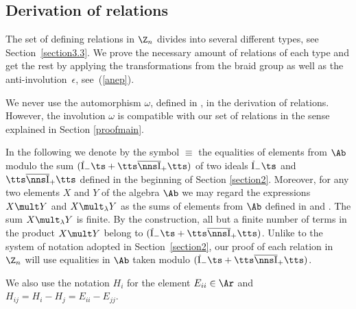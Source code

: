 \documentclass[11pt]{article}
\def\Ib{\tts\overline{\nns\rm I}_+\tts}\def\J{\mathrm{J}}\def\Jb{\,\overline{\!\rm I}_-\ts}\def\k{\mathfrak{k}}
\numberwithin{equation}{section}
\begin{document}
\subsection{Derivation of relations}\label{sectionDerRel}

The set  of def\/ining relations in $\Z_n$ divides into several dif\/ferent types,
see Section~\ref{section3.3}. We prove the necessary amount of relations
of each type and get the rest by applying the transformations from the braid group as well as the anti-involution~$\epsilon$, see~(\ref{anep}).


We never use the automorphism $\omega$, def\/ined in , in the derivation of relations. However, the involution $\omega$ is compatible with our set
of relations in the sense explained in Section \ref{proofmain}.


In the following we denote by the symbol $ \equiv $ the equalities of elements from $\Ab$ modulo the sum $(\Jb+\Ib )$ of two ideals $\Jb$ and $\Ib$
def\/ined in the beginning of Section \ref{section2}. Moreover,
for any two elements $X$ and $Y$ of the algebra $\Ab$ we may regard the expressions $X\mult Y$ and $X\mult_\lambda Y$ as the sums
of elements from $\Ab$ def\/ined in  and . The sum $X\mult_\lambda Y$  is f\/inite. By the construction,
all but a f\/inite number of terms in the product $X\mult Y$ belong to $(\Jb+\Ib )$. Unlike to the system of notation
adopted in Section~\ref{section2}, our proof of each relation in $\Z_n$ will use equalities in $\Ab$ taken modulo $(\Jb+\Ib )$.


We also use the notation $H_i$ for the element $E_{ii}\in\Ar$ and $H_{ij}=H_i-H_j=E_{ii}-E_{jj}$.
\end{document}
